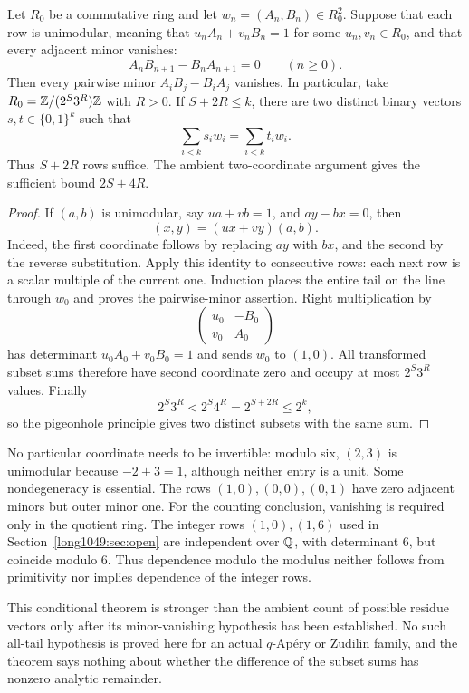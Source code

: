 \documentclass[11pt]{article}
\begin{document}
\begin{theorem}
\label{long1049:res:plucker-collapse}
Let $R_0$ be a commutative ring and let $w_n=(A_n,B_n)\in R_0^2$.  Suppose
that each row is unimodular, meaning that $u_nA_n+v_nB_n=1$ for some
$u_n,v_n\in R_0$, and that every adjacent minor vanishes:
\[
 A_nB_{n+1}-B_nA_{n+1}=0\qquad(n\ge0).
\]
Then every pairwise minor $A_iB_j-B_iA_j$ vanishes.  In particular, take
$R_0=\mathbb{Z}/(2^S3^R)\mathbb{Z}$ with $R>0$.  If $S+2R\le k$, there are two distinct
binary vectors $s,t\in\{0,1\}^{k}$ such that
\[
 \sum_{i<k}s_iw_i=\sum_{i<k}t_iw_i.
\]
Thus $S+2R$ rows suffice. The ambient two-coordinate argument gives
the sufficient bound $2S+4R$.
\end{theorem}

\begin{proof}
If $(a,b)$ is unimodular, say $ua+vb=1$, and $ay-bx=0$, then
\[
 (x,y)=(ux+vy)(a,b).
\]
Indeed, the first coordinate follows by replacing $ay$ with $bx$, and the
second by the reverse substitution.  Apply this identity to consecutive rows:
each next row is a scalar multiple of the current one.  Induction places the
entire tail on the line through $w_0$ and proves the pairwise-minor assertion.
Right multiplication by
\[
 \begin{pmatrix}u_0&-B_0\\v_0&A_0\end{pmatrix}
\]
has determinant $u_0A_0+v_0B_0=1$ and sends $w_0$ to $(1,0)$.
All transformed subset sums therefore have second coordinate zero
and occupy at most $2^S3^R$ values.  Finally
\[
 2^S3^R<2^S4^R=2^{S+2R}\le2^k,
\]
so the pigeonhole principle gives two distinct subsets with the same sum.
\end{proof}

\noindent No particular coordinate needs to be invertible: modulo six,
$(2,3)$ is unimodular because $-2+3=1$, although neither entry is a unit.
Some nondegeneracy is essential. The rows $(1,0),(0,0),(0,1)$ have
zero adjacent minors but outer minor one.
For the counting conclusion, vanishing is required only in the quotient
ring. The integer rows $(1,0),(1,6)$ used in Section~\ref{long1049:sec:open}
are independent over $\mathbb{Q}$, with determinant $6$, but coincide modulo $6$.
Thus dependence modulo the modulus neither follows from primitivity nor
implies dependence of the integer rows.

\noindent This conditional theorem is stronger than the ambient count of possible residue vectors only
after its minor-vanishing hypothesis has been established.  No such all-tail
hypothesis is proved here for an actual $q$-Ap\'ery or Zudilin family, and the
theorem says nothing about whether the difference of the subset sums has
nonzero analytic remainder.
\end{document}

